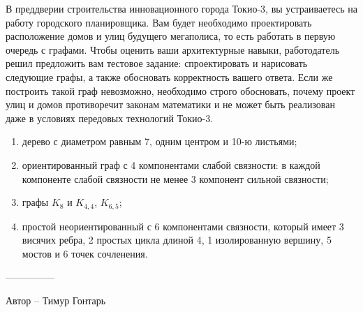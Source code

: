 \question
В преддверии строительства инновационного города Токио-3, вы устраиваетесь на работу городского планировщика. Вам будет необходимо проектировать расположение домов и улиц будущего мегаполиса, то есть работать в первую очередь с графами. Чтобы оценить ваши архитектурные навыки, работодатель решил предложить вам тестовое задание: спроектировать и нарисовать следующие графы, а также обосновать корректность вашего ответа. Если же построить такой граф невозможно, необходимо строго обосновать, почему проект улиц и домов противоречит законам математики и не может быть реализован даже в условиях передовых технологий Токио-3.

\begin{enumerate}
\item  дерево с диаметром равным 7, одним центром и 10-ю листьями;
\item  ориентированный граф с 4 компонентами слабой связности: в  каждой компоненте слабой связности не менее 3 компонент сильной связности;
\item  графы $K_8$ и $K_{4,4}$, $K_{6,5}$;
\item  простой неориентированный с 6 компонентами связности, который имеет 3 висячих ребра, 2 простых цикла длиной 4, 1 изолированную вершину, 5 мостов и 6 точек сочленения.
\end{enumerate}

---------------

Автор -- Тимур Гонтарь
